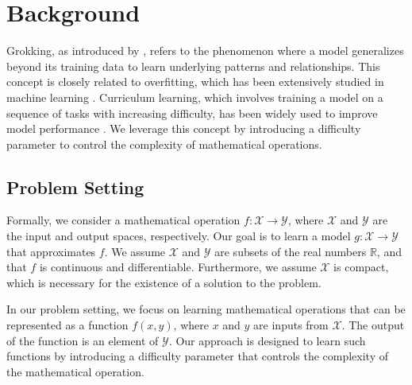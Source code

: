 \documentclass{article} %
\begin{document}

\section{Background}
\label{sec:background}

Grokking, as introduced by \citet{power2022grokking}, refers to the phenomenon where a model generalizes beyond its training data to learn underlying patterns and relationships. This concept is closely related to overfitting, which has been extensively studied in machine learning \citep{goodfellow2016deep}. Curriculum learning, which involves training a model on a sequence of tasks with increasing difficulty, has been widely used to improve model performance \cite{Bengio2009CurriculumL, Platanios2019CompetencebasedCL}. We leverage this concept by introducing a difficulty parameter to control the complexity of mathematical operations.

\subsection{Problem Setting}
\label{sec:problem_setting}

Formally, we consider a mathematical operation $f: \mathcal{X} \rightarrow \mathcal{Y}$, where $\mathcal{X}$ and $\mathcal{Y}$ are the input and output spaces, respectively. Our goal is to learn a model $g: \mathcal{X} \rightarrow \mathcal{Y}$ that approximates $f$. We assume $\mathcal{X}$ and $\mathcal{Y}$ are subsets of the real numbers $\mathbb{R}$, and that $f$ is continuous and differentiable. Furthermore, we assume $\mathcal{X}$ is compact, which is necessary for the existence of a solution to the problem.

In our problem setting, we focus on learning mathematical operations that can be represented as a function $f(x, y)$, where $x$ and $y$ are inputs from $\mathcal{X}$. The output of the function is an element of $\mathcal{Y}$. Our approach is designed to learn such functions by introducing a difficulty parameter that controls the complexity of the mathematical operation.
\end{document}
